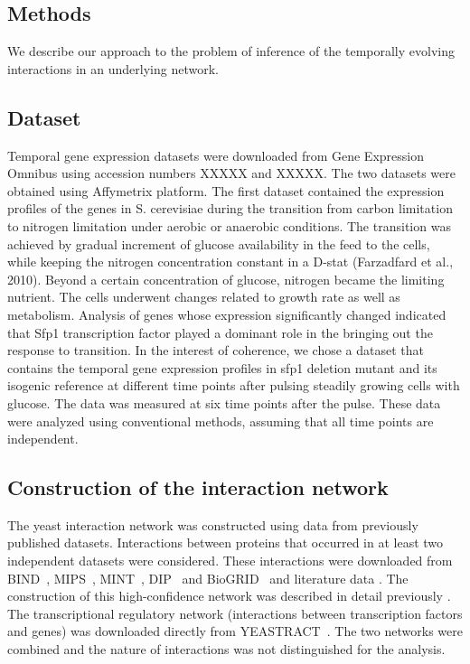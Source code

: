 \documentclass{bioinfo}
\begin{document}
\begin{methods}
\section{Methods}
We describe our approach to the problem of inference of the temporally
evolving interactions in an underlying network.
\subsection{Dataset}
 Temporal gene expression datasets were downloaded from Gene
 Expression Omnibus using accession numbers XXXXX and XXXXX. The two
 datasets were obtained using Affymetrix platform. The first dataset
 contained the expression profiles of the genes in S. cerevisiae
 during the transition from carbon limitation to nitrogen limitation
 under aerobic or anaerobic conditions. The transition was achieved by
 gradual increment of glucose availability in the feed to the cells,
 while keeping the nitrogen concentration constant in a D-stat
 (Farzadfard et al., 2010). Beyond a certain concentration of glucose,
 nitrogen became the limiting nutrient. The cells underwent changes
 related to growth rate as well as metabolism. Analysis of genes whose
 expression significantly changed indicated that Sfp1 transcription
 factor played a dominant role in the bringing out the response to
 transition. In the interest of coherence, we chose a dataset that
 contains the temporal gene expression profiles in sfp1 deletion
 mutant and its isogenic reference at different time points after
 pulsing steadily growing cells with glucose. The data was measured at
 six time points after the pulse. These data were analyzed using
 conventional methods, assuming that all time points are independent.

\subsection{Construction of the interaction network}

The yeast interaction network was constructed using data from
previously published datasets. Interactions between proteins that
occurred in at least two independent datasets were considered. These
interactions were downloaded from
BIND~\cite{Bader:2003:Nucleic-Acids-Res:12519993}, MIPS~\cite{MIPS},
MINT~\cite{citeulike:3733950}, DIP~\cite{citeulike:226627}  and
BioGRID~\cite{citeulike:814974}  and literature data . The construction of this high-confidence network was
described in detail previously . The
transcriptional regulatory network (interactions between transcription
factors and genes) was downloaded directly from
YEASTRACT~\cite{citeulike:473096}. The two networks were combined and
the nature of  interactions was not distinguished for the analysis.



\end{methods}
\end{document}
